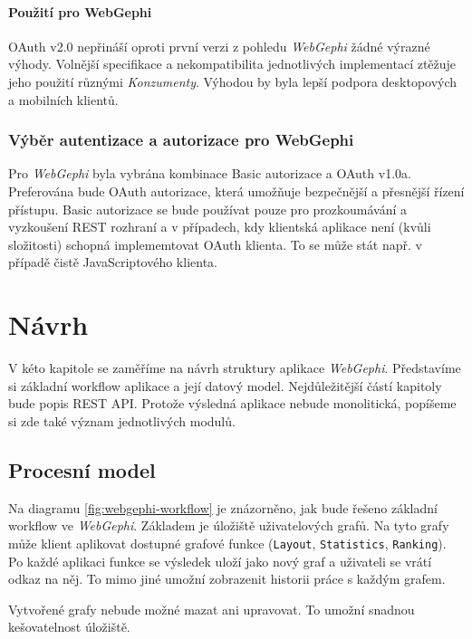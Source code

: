 \documentclass[thesis=M,czech]{FITthesis}[2014/05/6]
\begin{document}
\subsubsection{Použití pro WebGephi}
OAuth v2.0 nepřináší oproti první verzi z pohledu \textit{WebGephi} žádné výrazné výhody. Volnější specifikace a nekompatibilita jednotlivých implementací ztěžuje 
jeho použití různými \textit{Konzumenty}. Výhodou by byla lepší podpora desktopových a mobilních klientů.

\subsection{Výběr autentizace a autorizace pro WebGephi}
Pro \textit{WebGephi} byla vybrána kombinace Basic autorizace a OAuth v1.0a. Preferována bude OAuth autorizace, která umožňuje bezpečnější a přesnější řízení přístupu.
Basic autorizace se bude používat pouze pro prozkoumávání a vyzkoušení REST rozhraní a v případech, kdy klientská aplikace není (kvůli složitosti) schopná implememtovat OAuth klienta.
To se může stát např. v případě čistě JavaScriptového klienta.

\chapter{Návrh}
V kéto kapitole se zaměříme na návrh struktury aplikace \textit{WebGephi}. Představíme si základní workflow aplikace a její datový model.
Nejdůležitější částí kapitoly bude popis REST API. Protože výsledná aplikace nebude monolitická, popíšeme si zde také význam jednotlivých 
modulů.

\section{Procesní model}

Na diagramu \ref{fig:webgephi-workflow} je znázorněno, jak bude řešeno základní workflow ve \textit{WebGephi}. Základem je úložiště uživatelových 
grafů. Na tyto grafy může klient aplikovat dostupné grafové funkce (\texttt{Layout}, \texttt{Statistics}, \texttt{Ranking}). Po každé aplikaci funkce
se výsledek uloží jako nový graf a uživateli se vrátí odkaz na něj. To mimo jiné umožní zobrazenit historii práce s každým grafem.

Vytvořené grafy nebude možné mazat ani upravovat. To umožní snadnou kešovatelnost úložiště. 
\end{document}

